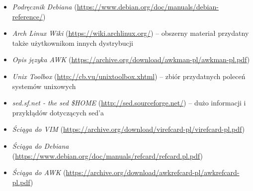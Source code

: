 % 
% 
% 
% 

\begin{itemize}
\item \emph{Podręcznik Debiana} (\url{https://www.debian.org/doc/manuals/debian-reference/})
\item \emph{Arch Linux Wiki} (\url{https://wiki.archlinux.org/}) – obszerny materiał przydatny także użytkownikom innych dystrybucji
\item \emph{Opis języka AWK} (\url{https://archive.org/download/awkman-pl/awkman-pl.pdf})

\item \emph{Unix Toolbox} (\url{http://cb.vu/unixtoolbox.xhtml}) – zbiór przydatnych poleceń systemów unixowych
\item \emph{sed.sf.net - the sed \$HOME} (\url{http://sed.sourceforge.net/}) – dużo informacji i przykłądów dotyczących sed'a

\item \emph{Ściąga do VIM} (\url{https://archive.org/download/virefcard-pl/virefcard-pl.pdf})
\item \emph{Ściąga do Debiana} (\url{https://www.debian.org/doc/manuals/refcard/refcard.pl.pdf})
\item \emph{Ściąga do AWK} (\url{https://archive.org/download/awkrefcard-pl/awkrefcard-pl.pdf})
\end{itemize}
